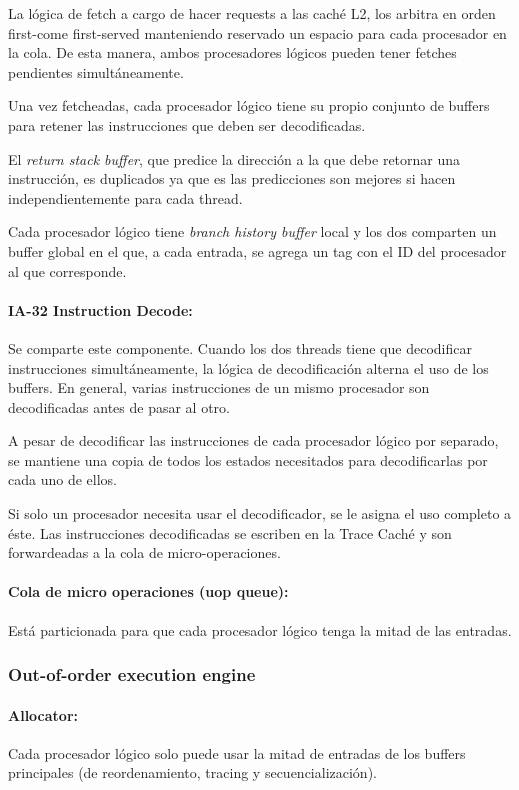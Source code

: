 La lógica de fetch a cargo de hacer requests a las caché L2, los arbitra en orden first-come first-served manteniendo reservado un espacio para cada procesador en la cola. De esta manera, ambos procesadores lógicos pueden tener fetches pendientes simultáneamente. 

Una vez fetcheadas, cada procesador lógico tiene su propio conjunto de buffers para retener las instrucciones que deben ser decodificadas.

El \textit{return stack buffer}, que predice la dirección a la que debe retornar una instrucción, es duplicados ya que es las predicciones son mejores si hacen independientemente para cada thread.

Cada procesador lógico tiene \textit{branch history buffer} local y los dos comparten un buffer global en el que, a cada entrada, se agrega un tag con el ID del procesador al que corresponde.

\paragraph{IA-32 Instruction Decode: } Se comparte este componente. Cuando los dos threads tiene que decodificar instrucciones simultáneamente, la lógica de decodificación alterna el uso de los buffers. En general, varias instrucciones de un mismo procesador son decodificadas antes de pasar al otro.

A pesar de decodificar las instrucciones de cada procesador lógico por separado, se mantiene una copia de todos los estados necesitados para decodificarlas por cada uno de ellos. 

Si solo un procesador necesita usar el decodificador, se le asigna el uso completo a éste. Las instrucciones decodificadas se escriben en la Trace Caché y son forwardeadas a la cola de micro-operaciones.

\paragraph{Cola de micro operaciones (uop queue):} Está particionada para que cada procesador lógico tenga la mitad de las entradas.

\subsubsection{Out-of-order execution engine}

\paragraph{Allocator:} Cada procesador lógico solo puede usar la mitad de entradas de los buffers principales (de reordenamiento, tracing y secuencialización).

